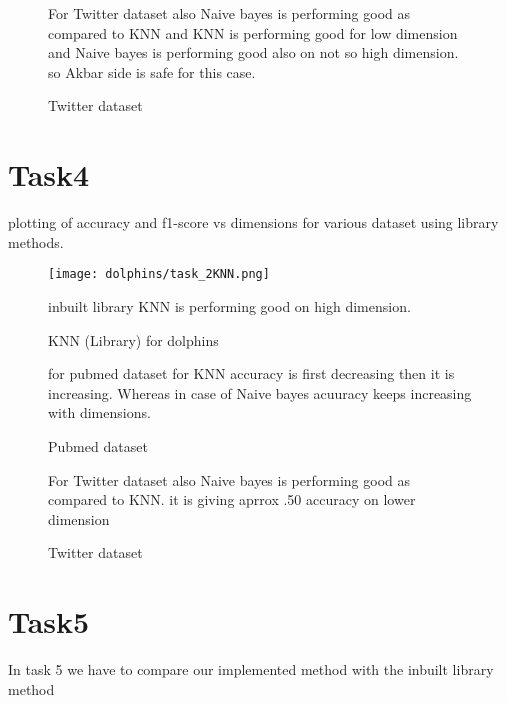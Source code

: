 \documentclass{article}
\begin{document}
\begin{figure}%
\centering
    \qquad
    \caption{Twitter dataset}%
    \label{fig:example}%
    
    For Twitter dataset also Naive bayes is performing good as compared to KNN and KNN is performing good for low dimension and Naive bayes is performing good also on not so high dimension.
    so Akbar side is safe for this case.
\end{figure}

\section{Task4}
plotting of accuracy and f1-score vs dimensions for various dataset using library methods.
\begin{figure}

\texttt{[image: dolphins/task\_2KNN.png]}
\caption{KNN (Library) for dolphins}
inbuilt library KNN is performing good on high dimension.
\end{figure}

\begin{figure}[!htb]%
\centering
    \qquad
    \caption{Pubmed dataset}%
    \label{fig:example}%
   
for pubmed dataset for KNN accuracy is first decreasing then it is increasing. Whereas in case of Naive bayes acuuracy keeps increasing with dimensions.
\end{figure}


\begin{figure}[!htb]%
\centering
    \qquad
    \caption{Twitter dataset}%
    \label{fig:example}%
    
    For Twitter dataset also Naive bayes is performing good as compared to KNN. it is giving aprrox .50 accuracy on lower dimension
    
\end{figure}

\section{Task5}
In task 5 we have to compare our implemented method with the inbuilt library method
\end{document}
